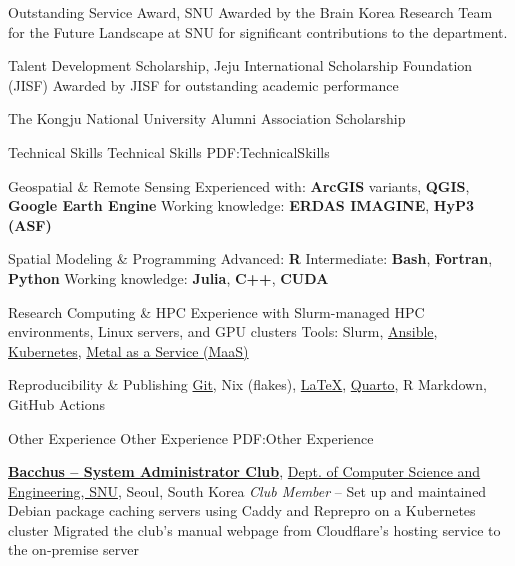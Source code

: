 \documentclass[letterpaper,MMMyyyy,nonstopmode]{simpleresumecv}
\begin{document}
\begin{Body}
\BulletItem
Outstanding Service Award, SNU
\hfill
{}
\Gap
\SubBulletItem
Awarded by the Brain Korea Research Team for the Future Landscape at SNU for significant contributions to the department.
\BigGap

\BulletItem
Talent Development Scholarship, Jeju International Scholarship Foundation (JISF)
\hfill
{}
\Gap
\SubBulletItem
Awarded by JISF for outstanding academic performance
\BigGap

\BulletItem
The Kongju National University Alumni Association Scholarship
\hfill
{}





\Section
{Technical Skills}
{Technical Skills}
{PDF:TechnicalSkills}

\BulletItem
Geospatial \& Remote Sensing
\SubBulletItem
Experienced with: \textbf{ArcGIS} variants, \textbf{QGIS}, \textbf{Google Earth Engine}
\SubBulletItem
Working knowledge: \textbf{ERDAS IMAGINE}, \textbf{HyP3 (ASF)}

\Gap
\BulletItem
Spatial Modeling \& Programming
\SubBulletItem
Advanced: \textbf{R}
\SubBulletItem
Intermediate: \textbf{Bash}, \textbf{Fortran}, \textbf{Python}
\SubBulletItem
Working knowledge: \textbf{Julia}, \textbf{C++}, \textbf{CUDA}

\Gap
\BulletItem
Research Computing \& HPC
\SubBulletItem
Experience with Slurm-managed HPC environments, Linux servers, and GPU clusters
\SubBulletItem
Tools: Slurm, \href{https://www.ansible.com/}{Ansible}, \href{https://kubernetes.io/}{Kubernetes}, \href{https://maas.io/}{Metal as a Service (MaaS)}

\Gap
\BulletItem
Reproducibility \& Publishing
\SubBulletItem
\href{https://git-scm.com/}{Git}, Nix (flakes), \href{https://www.latex-project.org/}{LaTeX}, \href{https://quarto.org/}{Quarto}, R Markdown, GitHub Actions





\Section
{Other Experience}
{Other Experience}
{PDF:Other Experience}

\Entry
\textbf{\href{https://github.com/bacchus-snu}{Bacchus – System Administrator Club}}, \href{https://cse.snu.ac.kr/en/about/student-clubs?selected=Bacchus}{Dept. of Computer Science and Engineering, SNU}, Seoul, South Korea
\Gap
\textit{      Club Member}
\hfill
{} -- %
\Gap
\SubBulletItem
Set up and maintained Debian package caching servers using Caddy and Reprepro on a Kubernetes cluster
\Gap
\SubBulletItem
Migrated the club's manual webpage from Cloudflare's hosting service to the on-premise server
\BigGap


\end{Body}
\end{document}
